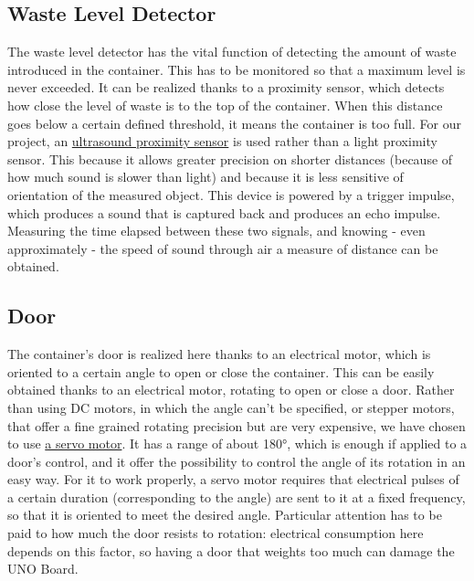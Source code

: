 \documentclass[a4paper,12pt]{report}
\begin{document}
	\subsection{Waste Level Detector}
	The waste level detector has the vital function of detecting the amount of waste introduced in the container. This has to be monitored so that a maximum level is never exceeded.\newline
	It can be realized thanks to a proximity sensor, which detects how close the level of waste is to the top of the container. When this distance goes below a certain defined threshold, it means the container is too full. For our project, an \href{https://docs.google.com/document/d/1Y-yZnNhMYy7rwhAgyL_pfa39RsB-x2qR4vP8saG73rE/edit?tab=t.0}{ultrasound proximity sensor} is used rather than a light proximity sensor. This because it allows greater precision on shorter distances (because of how much sound is slower than light) and because it is less sensitive of orientation of the measured object. This device is powered by a trigger impulse, which produces a sound that is captured back and produces an echo impulse. Measuring the time elapsed between these two signals, and knowing - even approximately - the speed of sound through air a measure of distance can be obtained.
	
	\subsection{Door}
	The container's door is realized here thanks to an electrical motor, which is oriented to a certain angle to open or close the container.\newline
	This can be easily obtained thanks to an electrical motor, rotating to open or close a door. Rather than using DC motors, in which the angle can't be specified, or stepper motors, that offer a fine grained rotating precision but are very expensive, we have chosen to use \href{https://www.kjell.com/globalassets/mediaassets/701916_87897_datasheet_en.pdf?ref=4287817A7A}{a servo motor}. It has a range of about 180°, which is enough if applied to a door's control, and it offer the possibility to control the angle of its rotation in an easy way. For it to work properly, a servo motor requires that electrical pulses of a certain duration (corresponding to the angle) are sent to it at a fixed frequency, so that it is oriented to meet the desired angle. Particular attention has to be paid to how much the door resists to rotation: electrical consumption here depends on this factor, so having a door that weights too much can damage the UNO Board.
	
\end{document}
